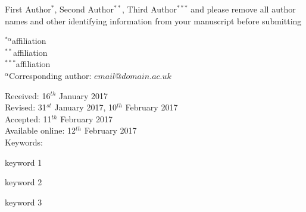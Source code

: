\documentclass[paper=a4,fontsize=11pt,twocolumn]{article}
\begin{document}
		\Large{First Author$^{*}$, Second Author$^{**}$, Third Author$^{***}$ and please remove all author names and other identifying information from your manuscript before submitting}	

		\setlength{\columnseprule}{1pt}
		\def\columnseprulecolor{\color{brand-secondary}}
		\begin{multicols}{2}
			\small{$^{*\alpha}$affiliation\smallskip\\
				$^{**}$affiliation\smallskip\\
				$^{***}$affiliation}\bigskip\smallskip\\
			\vfill
			\small{$^{\alpha}$Corresponding author: $email@domain.ac.uk$}
			\columnbreak

			\hangindent=0.8cm 
			\small{
				\hspace{8mm}Received: 16$^{th}$ January 2017\smallskip\\
				Revised: 31$^{st}$ January 2017, 10$^{th}$ February 2017\smallskip\\
				Accepted: 11$^{th}$ February 2017\smallskip\\
				Available online: 12$^{th}$ February 2017\bigskip\\
				\vfill
				\hspace{8mm}Keywords: \colorbox{brand-midlight}{\strut keyword 1} \colorbox{brand-midlight}{\strut keyword 2} \colorbox{brand-midlight}{\strut keyword 3}
				}
		\end{multicols}
		\bigskip		
\end{document}
